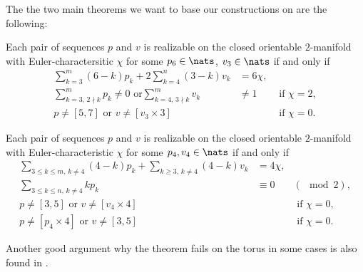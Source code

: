 The the two main theorems we want to base our constructions on are the following:

\begin{theorem} \label{thm:eberhard:extended:3}
  Each pair of sequences $p$ and $v$ is realizable on the closed orientable $2$-manifold with {\sc Euler}-charactersitic $\chi$ for some $p_6 \in \nats$, $v_3 \in \nats$ if and only if
  \begin{align*}
    \sum_{k=3}^m (6-k)p_k + 2 \sum_{k=4}^n (3-k)v_k &= 6\chi, \\
    \sum_{k=3,\, 2 \nmid k}^{m} p_k \neq 0 \text{ or} \sum_{k=4, \,3 \nmid k}^m v_k &\neq 1 &\text{ if } \chi = 2, \\
    p \neq [5, 7] \text{ or } v \neq [v_3 \times 3]  &&\text{ if } \chi = 0.
  \end{align*}
\end{theorem}

\begin{theorem} \label{thm:eberhard:extended:4}
  Each pair of sequences $p$ and $v$ is realizable on the closed orientable $2$-manifold with {\sc Euler}-characteristic $\chi$ for some $p_4, v_4 \in \nats$ if and only if
  \begin{align*}
    \sum_{3 \leq k \leq m,\, k \neq 4} (4-k)p_k + \sum_{k \geq 3,\, k\neq 4} (4-k)v_k &= 4\chi, \\
    \sum_{3 \leq k \leq n,\, k \neq 4} k p_k &\equiv 0& (\mod 2), \\
    p \neq [3, 5] \text{ or } v \neq [v_4 \times 4] &&\text{ if } \chi = 0,\\
    p \neq [p_4 \times 4] \text{ or } v \neq [3, 5] &&\text{ if } \chi = 0.
  \end{align*}
\end{theorem}

Another good argument why the theorem fails on the torus in some cases is also found in \cite{izmestiev2013there}.